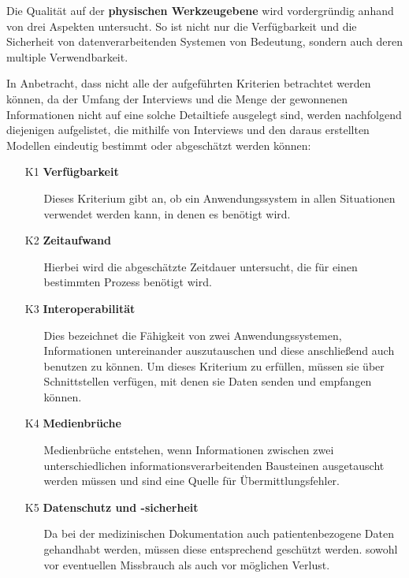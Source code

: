 Die Qualität auf der \textbf{physischen Werkzeugebene} wird vordergründig anhand von drei Aspekten untersucht. So ist nicht nur die Verfügbarkeit und die Sicherheit von datenverarbeitenden Systemen von Bedeutung, sondern auch deren multiple Verwendbarkeit.

In Anbetracht, dass nicht alle der aufgeführten Kriterien betrachtet werden können, da der Umfang der Interviews und die Menge der gewonnenen Informationen nicht auf eine solche Detailtiefe ausgelegt sind, werden nachfolgend diejenigen aufgelistet, die mithilfe von Interviews und den daraus erstellten Modellen eindeutig bestimmt oder abgeschätzt werden können:

\begin{itemize}
	\item[K1] \textbf{Verfügbarkeit}
	\begin{itemize}
		\item[] Dieses Kriterium gibt an, ob ein Anwendungssystem in allen Situationen verwendet werden kann, in denen es benötigt wird.
	\end{itemize}
	\item[K2] \textbf{Zeitaufwand}
	\begin{itemize}
		\item[] Hierbei wird die abgeschätzte Zeitdauer untersucht, die für einen bestimmten Prozess benötigt wird.
	\end{itemize}
	\item[K3] \textbf{Interoperabilität}
	\begin{itemize}
		\item[] Dies bezeichnet die Fähigkeit von zwei Anwendungssystemen, Informationen untereinander auszutauschen und diese anschließend auch benutzen zu können. Um dieses Kriterium zu erfüllen, müssen sie über Schnittstellen verfügen, mit denen sie Daten senden und empfangen können.
	\end{itemize}
	\item[K4] \textbf{Medienbrüche}
	\begin{itemize}
		\item[] Medienbrüche entstehen, wenn Informationen zwischen zwei unterschiedlichen informationsverarbeitenden Bausteinen ausgetauscht werden müssen und sind eine Quelle für Übermittlungsfehler.
	\end{itemize}
	\item[K5] \textbf{Datenschutz und -sicherheit}
	\begin{itemize}
		\item[] Da bei der medizinischen Dokumentation auch patientenbezogene Daten gehandhabt werden, müssen diese entsprechend geschützt werden. sowohl vor eventuellen Missbrauch als auch vor möglichen Verlust.
	\end{itemize}
\end{itemize}